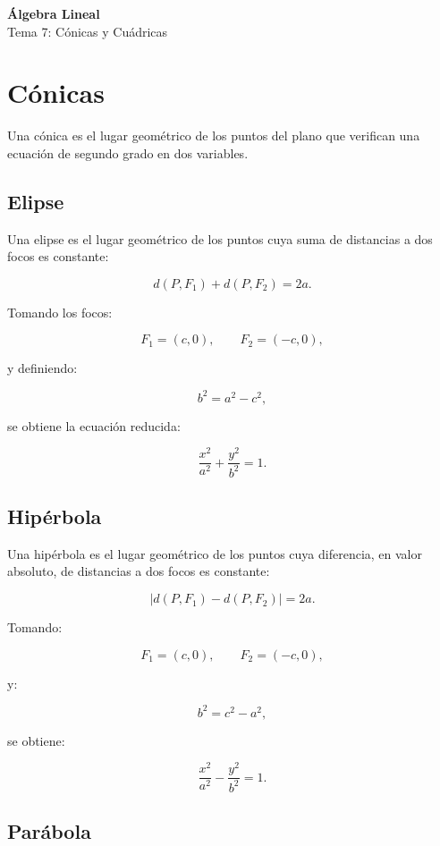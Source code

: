 \documentclass[11pt,a4paper]{article}
\begin{document}
\begin{center}
{\LARGE\bfseries Álgebra Lineal}\\[0.4em]
{\Large Tema 7: Cónicas y Cuádricas}
\end{center}

\tableofcontents
\newpage

\section{Cónicas}

Una cónica es el lugar geométrico de los puntos del plano que verifican una ecuación de segundo grado en dos variables.

\subsection{Elipse}

Una elipse es el lugar geométrico de los puntos cuya suma de distancias a dos focos es constante:

\[
d(P,F_1)+d(P,F_2)=2a.
\]

Tomando los focos:

\[
F_1=(c,0),
\qquad
F_2=(-c,0),
\]

y definiendo:

\[
b^2=a^2-c^2,
\]

se obtiene la ecuación reducida:

\[
\boxed{
\frac{x^2}{a^2}
+
\frac{y^2}{b^2}
=
1.
}
\]

\subsection{Hipérbola}

Una hipérbola es el lugar geométrico de los puntos cuya diferencia, en valor absoluto, de distancias a dos focos es constante:

\[
|d(P,F_1)-d(P,F_2)|=2a.
\]

Tomando:

\[
F_1=(c,0),
\qquad
F_2=(-c,0),
\]

y:

\[
b^2=c^2-a^2,
\]

se obtiene:

\[
\boxed{
\frac{x^2}{a^2}
-
\frac{y^2}{b^2}
=
1.
}
\]

\subsection{Parábola}
\end{document}
